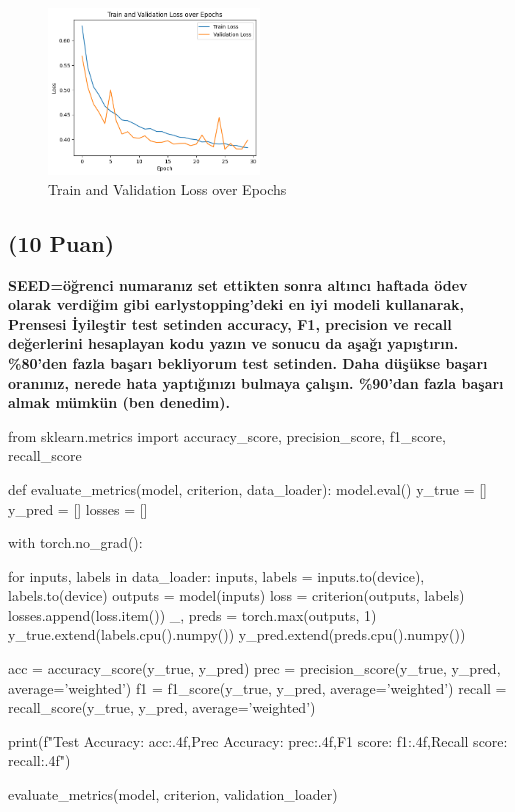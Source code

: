 \documentclass[11pt]{article}
\begin{document}

\begin{figure}[ht!]
    \centering
    \includegraphics[width=0.50\textwidth]{figure.png}
    \caption{Train and Validation Loss over Epochs}
    \label{fig:Train and Validation Loss over Epochs}
\end{figure}
\newpage



\subsection{(10 Puan)} \textbf{SEED=öğrenci numaranız set ettikten sonra altıncı haftada ödev olarak verdiğim gibi earlystopping'deki en iyi modeli kullanarak, Prensesi İyileştir test setinden accuracy, F1, precision ve recall değerlerini hesaplayan kodu yazın ve sonucu da aşağı yapıştırın. \%80'den fazla başarı bekliyorum test setinden. Daha düşükse başarı oranınız, nerede hata yaptığınızı bulmaya çalışın. \%90'dan fazla başarı almak mümkün (ben denedim).}

\begin{python}
from sklearn.metrics import accuracy_score, precision_score, f1_score, recall_score

def evaluate_metrics(model, criterion, data_loader):
    model.eval()
    y_true = []
    y_pred = []
    losses = []
    
    with torch.no_grad():

        for inputs, labels in data_loader:
            inputs, labels = inputs.to(device), labels.to(device)
            outputs = model(inputs)
            loss = criterion(outputs, labels)
            losses.append(loss.item())
            _, preds = torch.max(outputs, 1)
            y_true.extend(labels.cpu().numpy())
            y_pred.extend(preds.cpu().numpy())
            
    acc = accuracy_score(y_true, y_pred)
    prec = precision_score(y_true, y_pred, average='weighted')
    f1 = f1_score(y_true, y_pred, average='weighted')
    recall = recall_score(y_true, y_pred, average='weighted')
    
    print(f"Test Accuracy: {acc:.4f},Prec Accuracy: {prec:.4f},F1 score: {f1:.4f},Recall score: {recall:.4f}")


evaluate_metrics(model, criterion, validation_loader)
\end{python}
\end{document}
